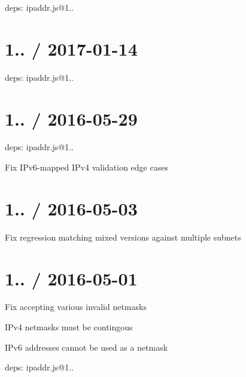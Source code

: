 
\begin{DoxyItemize}
\item deps\+: ipaddr.\+js@1..
\end{DoxyItemize}

\section*{1.. / 2017-\/01-\/14 }


\begin{DoxyItemize}
\item deps\+: ipaddr.\+js@1..
\end{DoxyItemize}

\section*{1.. / 2016-\/05-\/29 }


\begin{DoxyItemize}
\item deps\+: ipaddr.\+js@1..
\begin{DoxyItemize}
\item Fix I\+Pv6-\/mapped I\+Pv4 validation edge cases
\end{DoxyItemize}
\end{DoxyItemize}

\section*{1.. / 2016-\/05-\/03 }


\begin{DoxyItemize}
\item Fix regression matching mixed versions against multiple subnets
\end{DoxyItemize}

\section*{1.. / 2016-\/05-\/01 }


\begin{DoxyItemize}
\item Fix accepting various invalid netmasks
\begin{DoxyItemize}
\item I\+Pv4 netmasks must be contingous
\item I\+Pv6 addresses cannot be used as a netmask
\end{DoxyItemize}
\item deps\+: ipaddr.\+js@1..
\end{DoxyItemize}

